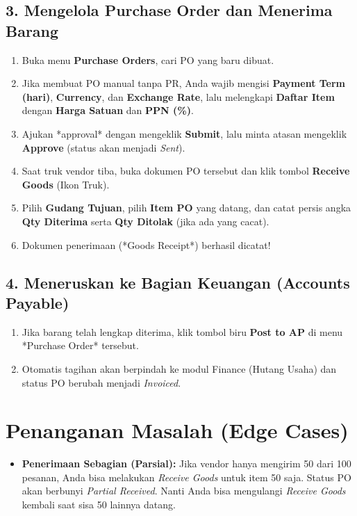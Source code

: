 \subsection{3. Mengelola Purchase Order dan Menerima Barang}
\begin{enumerate}
    \item Buka menu \textbf{Purchase Orders}, cari PO yang baru dibuat.
    \item Jika membuat PO manual tanpa PR, Anda wajib mengisi \textbf{Payment Term (hari)}, \textbf{Currency}, dan \textbf{Exchange Rate}, lalu melengkapi \textbf{Daftar Item} dengan \textbf{Harga Satuan} dan \textbf{PPN (\%)}.
    \item Ajukan *approval* dengan mengeklik \textbf{Submit}, lalu minta atasan mengeklik \textbf{Approve} (status akan menjadi \textit{Sent}).
    \item Saat truk vendor tiba, buka dokumen PO tersebut dan klik tombol \textbf{Receive Goods} (Ikon Truk).
    \item Pilih \textbf{Gudang Tujuan}, pilih \textbf{Item PO} yang datang, dan catat persis angka \textbf{Qty Diterima} serta \textbf{Qty Ditolak} (jika ada yang cacat).
    \item Dokumen penerimaan (*Goods Receipt*) berhasil dicatat!
\end{enumerate}

\subsection{4. Meneruskan ke Bagian Keuangan (Accounts Payable)}
\begin{enumerate}
    \item Jika barang telah lengkap diterima, klik tombol biru \textbf{Post to AP} di menu *Purchase Order* tersebut.
    \item Otomatis tagihan akan berpindah ke modul Finance (Hutang Usaha) dan status PO berubah menjadi \textit{Invoiced}.
\end{enumerate}

\section{Penanganan Masalah (Edge Cases)}
\begin{itemize}
    \item \textbf{Penerimaan Sebagian (Parsial):} Jika vendor hanya mengirim 50 dari 100 pesanan, Anda bisa melakukan \textit{Receive Goods} untuk item 50 saja. Status PO akan berbunyi \textit{Partial Received}. Nanti Anda bisa mengulangi \textit{Receive Goods} kembali saat sisa 50 lainnya datang.
\end{itemize}
